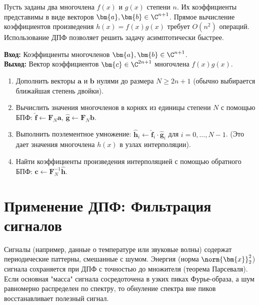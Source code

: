 Пусть заданы два многочлена $f(x)$ и $g(x)$ степени $n$. Их коэффициенты представимы в виде векторов $\bm{a}, \bm{b} \in \C^{n+1}$. Прямое вычисление коэффициентов произведения $h(x) = f(x)g(x)$ требует $O(n^2)$ операций. Использование ДПФ позволяет решить задачу асимптотически быстрее.

\begin{tcbalgorithmbox}
\label{alg:poly_mult}
    \textbf{Вход:} Коэффициенты многочленов $\bm{a}, \bm{b} \in \C^{n+1}$.\\
    \textbf{Выход:} Вектор коэффициентов $\bm{c} \in \C^{2n+1}$ многочлена $f(x)g(x)$.
    \begin{enumerate}
        \item Дополнить векторы $\bm{a}$ и $\bm{b}$ нулями до размера $N \geq 2n+1$ (обычно выбирается ближайшая степень двойки).
        \item Вычислить значения многочленов в корнях из единицы степени $N$ с помощью БПФ: 
              $\bm{\hat{f}} \gets \bm{F}_N \bm{a}$, $\bm{\hat{g}} \gets \bm{F}_N \bm{b}$.
        \item Выполнить поэлементное умножение: $\bm{\hat{h}}_i \gets \bm{\hat{f}}_i \cdot \bm{\hat{g}}_i$ для $i = 0, \dots, N-1$. (Это дает значения многочлена $h(x)$ в узлах интерполяции).
        \item Найти коэффициенты произведения интерполяцией с помощью обратного БПФ: 
              $\bm{c} \gets \bm{F}_N^{-1} \bm{\hat{h}}$.
    \end{enumerate}
\end{tcbalgorithmbox}

\section{Применение ДПФ: Фильтрация сигналов}
\label{sec:signal_filtering}

\begin{tcbinsight}
    Сигналы (например, данные о температуре или звуковые волны) содержат периодические паттерны, смешанные с шумом. Энергия (норма $\norm{\bm{x}}_2^2$) сигнала сохраняется при ДПФ с точностью до множителя (теорема Парсеваля). Если основная "масса" сигнала сосредоточена в узких пиках Фурье-образа, а шум равномерно распределен по спектру, то обнуление спектра вне пиков восстанавливает полезный сигнал.
\end{tcbinsight}

